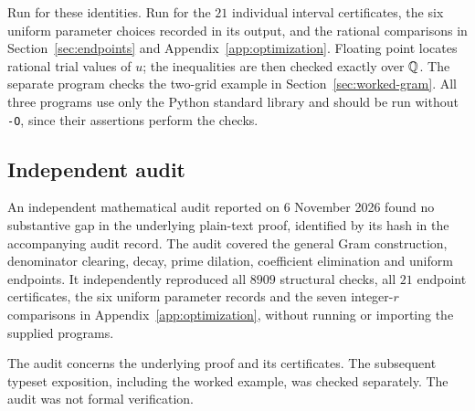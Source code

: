 Run  for these identities.
Run  for the $21$ individual interval
certificates, the six uniform parameter choices recorded in its
output, and the rational comparisons in
Section~\ref{sec:endpoints} and Appendix~\ref{app:optimization}.
Floating point locates rational trial values of $u$; the inequalities
are then checked exactly over $\mathbb Q$.
The separate program  checks the
two-grid example in Section~\ref{sec:worked-gram}.
All three programs use only the Python standard library and should
be run without \texttt{-O}, since their assertions perform the checks.

\subsection{Independent audit}

An independent mathematical audit reported on 6 November 2026
found no substantive gap in the underlying plain-text proof,
identified by its hash in the accompanying audit record.
The audit covered the general Gram construction, denominator
clearing, decay, prime dilation, coefficient elimination and
uniform endpoints. It independently reproduced all $8909$
structural checks, all $21$ endpoint certificates, the six uniform
parameter records and the seven integer-$r$ comparisons in
Appendix~\ref{app:optimization}, without running or importing
the supplied programs.

The audit concerns the underlying proof and its certificates.
The subsequent typeset exposition, including the worked example,
was checked separately. The audit was not formal verification.
